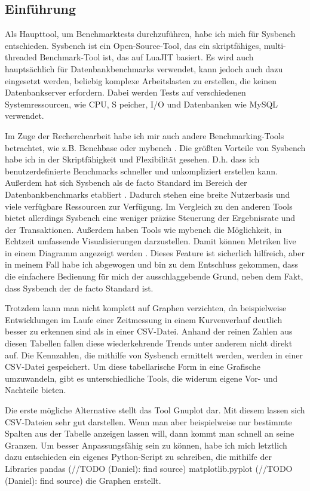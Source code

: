 \subsection{Einführung}\label{subsec:einfuhrung}

Als Haupttool, um Benchmarktests durchzuführen, habe ich mich für Sysbench \cite{sysbench_repo}
entschieden. Sysbench ist ein Open-Source-Tool, das ein skriptfähiges, multi-threaded Benchmark-Tool
ist, das auf LuaJIT basiert. Es wird auch hauptsächlich für Datenbankbenchmarks verwendet, kann
jedoch auch dazu eingesetzt werden, beliebig komplexe Arbeitslasten zu erstellen, die keinen
Datenbankserver erfordern. Dabei werden Tests auf verschiedenen Systemressourcen, wie CPU, S
peicher, I/O und Datenbanken wie MySQL \cite{sysbench_mysql} verwendet.

Im Zuge der Recherchearbeit habe ich mir auch andere Benchmarking-Tools betrachtet, wie z.B.
Benchbase \cite{DifallahPCC13} oder mybench \cite{mybench_repo}. Die größten Vorteile von
Sysbench habe ich in der Skriptfähigkeit und Flexibilität gesehen. D.h. dass ich benutzerdefinierte
Benchmarks schneller und unkompliziert erstellen kann. Außerdem hat sich Sysbench als de facto
Standard im Bereich der Datenbankbenchmarks etabliert \cite{mybench_comparison}. Dadurch stehen
eine breite Nutzerbasis und viele verfügbare Ressourcen zur Verfügung. Im Vergleich zu den
anderen Tools bietet allerdings Sysbench eine weniger präzise Steuerung der Ergebnisrate
und der Transaktionen. Außerdem haben Tools wie mybench die Möglichkeit, in Echtzeit umfassende
Visualisierungen darzustellen. Damit können Metriken live in einem Diagramm angezeigt werden
\cite{mybench_user_interface}. Dieses Feature ist sicherlich hilfreich, aber in meinem Fall habe
ich abgewogen und bin zu dem Entschluss gekommen, dass die einfachere Bedienung für mich der
ausschlaggebende Grund, neben dem Fakt, dass Sysbench der de facto Standard ist.

Trotzdem kann man nicht komplett auf Graphen verzichten, da beispielweise Entwicklungen
im Laufe einer Zeitmessung in einem Kurvenverlauf deutlich besser zu erkennen sind als in einer CSV-Datei.
Anhand der reinen Zahlen aus diesen Tabellen fallen diese wiederkehrende Trends unter anderem nicht direkt auf.
Die Kennzahlen, die mithilfe von Sysbench ermittelt werden, werden in einer CSV-Datei gespeichert.
Um diese tabellarische Form in eine Grafische umzuwandeln, gibt es unterschiedliche Tools, die widerum
eigene Vor- und Nachteile bieten.

Die erste mögliche Alternative stellt das Tool Gnuplot \cite{gnuplot} dar.
Mit diesem lassen sich CSV-Dateien sehr gut darstellen. Wenn man aber beispielweise nur bestimmte Spalten
aus der Tabelle anzeigen lassen will, dann kommt man schnell an seine Granzen.
Um besser Anpassungsfähig sein zu können, habe ich mich letztlich dazu entschieden ein eigenes Python-Script
zu schreiben, die mithilfe der Libraries pandas (//TODO (Daniel): find source) matplotlib.pyplot (//TODO (Daniel): find source)
die Graphen erstellt.

